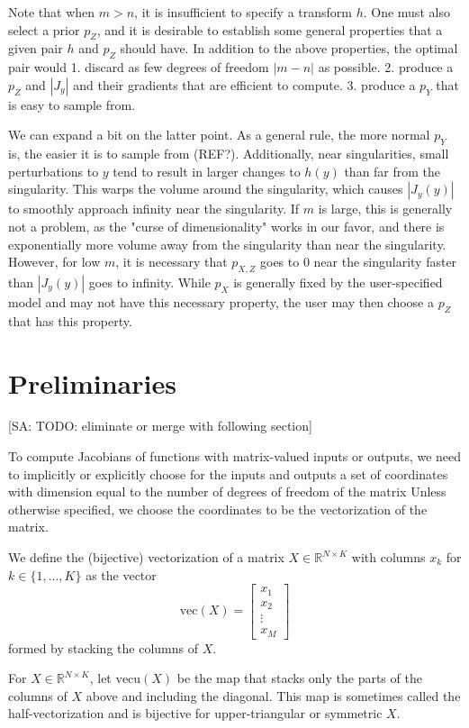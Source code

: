 \documentclass[11pt]{article}
\newcommand{\vect}{\mathrm{vec}}
\newcommand{\vectu}{\mathrm{vecu}}
\begin{document}
Note that when $m > n$, it is insufficient to specify a transform $h$.
One must also select a prior $p_Z$, and it is desirable to establish some general properties that a given pair $h$ and $p_Z$ should have.
In addition to the above properties, the optimal pair would
1. discard as few degrees of freedom $|m - n|$ as possible.
2. produce a $p_Z$ and $|J_y|$ and their gradients that are efficient to compute.
3. produce a $p_Y$ that is easy to sample from.

We can expand a bit on the latter point.
As a general rule, the more normal $p_Y$ is, the easier it is to sample from (REF?).
Additionally, near singularities, small perturbations to $y$ tend to result in larger changes to $h(y)$ than far from the singularity.
This warps the volume around the singularity, which causes $|J_y(y)|$ to smoothly approach infinity near the singularity.
If $m$ is large, this is generally not a problem, as the "curse of dimensionality" works in our favor, and there is exponentially more volume away from the singularity than near the singularity.
However, for low $m$, it is necessary that $p_{X,Z}$ goes to 0 near the singularity faster than $|J_y(y)|$ goes to infinity.
While $p_X$ is generally fixed by the user-specified model and may not have this necessary property, the user may then choose a $p_Z$ that has this property.

\section{Preliminaries}

[SA: TODO: eliminate or merge with following section]

To compute Jacobians of functions with matrix-valued inputs or outputs, we need to implicitly or explicitly choose for the inputs and outputs a set of coordinates with dimension equal to the number of degrees of freedom of the matrix
Unless otherwise specified, we choose the coordinates to be the vectorization of the matrix.

We define the (bijective) vectorization of a matrix $X \in \mathbb{R}^{N \times K}$ with columns $x_k$ for $k \in \{1, ..., K\}$ as the vector
\[\vect(X) = \begin{bmatrix}x_1 \\ x_2 \\ \vdots \\ x_M\end{bmatrix}\]
formed by stacking the columns of $X$.

For $X \in \mathbb{R}^{N \times K}$, let $\vectu(X)$ be the map that stacks only the parts of the columns of $X$ above and including the diagonal.
This map is sometimes called the half-vectorization and is bijective for upper-triangular or symmetric $X$.
\end{document}

